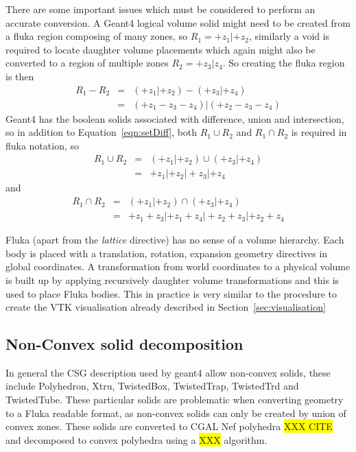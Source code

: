 \documentclass[final,5p,times,twocolumn]{elsarticle}
\begin{document}
There are some important issues which must be considered to perform an accurate conversion. 
A Geant4 logical volume solid might need to be created from a fluka region composing of many zones, 
so $R_1 = +z_1 | +z_2$, similarly a void is required to locate daughter volume placements which again 
might also be converted to a region of multiple zones $R_2= +z_3| z_4$. So creating the fluka region is then 
\begin{eqnarray}
R_1 - R_2 	& = & (+z_1 | +z_2) - ( +z_3 | +z_4) 			\\
			& = & (+z_1 - z_3 - z_4)  | (+z_2 - z_3 - z_4)	
\label{eqn:setDiff}
\end{eqnarray}
Geant4 has the boolean solids associated with difference, union and intersection, so in addition to Equation~\ref{eqn:setDiff}, both $R_1 \cup R_2$ and 
$R_1 \cap R_2$ is required in fluka notation, so 
\begin{eqnarray}
R_1 \cup R_2 	& = & (+z_1 | +z_2)  \cup ( +z_3 | +z_4) \\
			& = & +z_1 | +z_2 |  +z_3 | +z_4
\end{eqnarray}
and 
\begin{eqnarray}
R_1 \cap R_2 	& = & (+z_1 | +z_2) \cap ( +z_3 | +z_4) \\
			& = & +z_1 +z_3  | +z_1 +z_4 | +z_2 +z_3 | +z_2 +z_4
\end{eqnarray}

Fluka (apart from the {\it lattice} directive) has no sense of a volume hierarchy. Each body is placed with a 
translation, rotation, expansion geometry directives in global coordinates. A transformation from world coordinates
to a physical volume is built up by applying recursively daughter volume transformations and  this is used to place Fluka bodies. 
This  in practice is very similar to the procedure to create the VTK visualisation already described in Section~\ref{sec:visualisation}

\subsection{Non-Convex solid decomposition}
In general the CSG description used by geant4 allow non-convex solids, these include Polyhedron, Xtru, TwistedBox, 
TwistedTrap, TwistedTrd and TwistedTube. These particular solids are problematic when converting geometry to a Fluka 
readable format, as non-convex solids can only be created by union of convex zones. These solids are converted to CGAL 
Nef polyhedra \colorbox{yellow}{XXX CITE} and decomposed to convex polyhedra using a \colorbox{yellow}{XXX} algorithm. 
\end{document}
